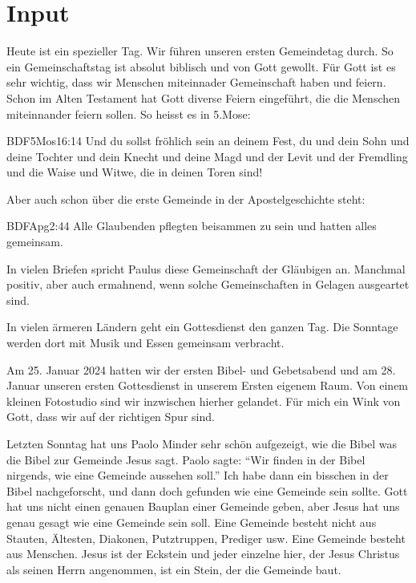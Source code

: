 \documentclass{../../inc/mybib}
\begin{document}
\section{ Input }
\begin{spacing}{1.5}
    Heute ist ein spezieller Tag. Wir führen unseren ersten Gemeindetag durch. So ein Gemeinschaftstag ist absolut biblisch und von Gott gewollt. Für Gott ist es sehr wichtig, dass wir Menschen miteinnader Gemeinschaft haben und feiern. Schon im Alten Testament hat Gott diverse Feiern eingeführt, die die Menschen miteinnander feiern sollen. So heisst es in 5.Mose:
\begin{bibelbox}{BDF}{5Mos}{16:14}
    Und du sollst fröhlich sein an deinem Fest, du und dein Sohn und deine Tochter und dein Knecht und deine Magd und der Levit und der Fremdling und die Waise und Witwe, die in deinen Toren sind!
\end{bibelbox}
Aber auch schon über die erste Gemeinde in der Apostelgeschichte steht:
\begin{bibelbox}{BDF}{Apg}{2:44}
    Alle Glaubenden pflegten beisammen zu sein und hatten alles gemeinsam.
\end{bibelbox}
In vielen Briefen spricht Paulus diese Gemeinschaft der Gläubigen an. Manchmal positiv, aber auch ermahnend, wenn solche Gemeinschaften in Gelagen ausgeartet sind.

In vielen ärmeren Ländern geht ein Gottesdienst den ganzen Tag. Die Sonntage werden dort mit Musik und Essen gemeinsam verbracht.

Am 25. Januar 2024 hatten wir der ersten Bibel- und Gebetsabend und am 28. Januar unseren ersten Gottesdienst in unserem Ersten eigenem Raum. Von einem kleinen Fotostudio sind wir inzwischen hierher gelandet. Für mich ein Wink von Gott, dass wir auf der richtigen Spur sind.

Letzten Sonntag hat uns Paolo Minder sehr schön aufgezeigt, wie die Bibel was die Bibel zur Gemeinde Jesus sagt. Paolo sagte: \enquote{Wir finden in der Bibel nirgends, wie eine Gemeinde aussehen soll.} Ich habe dann ein bisschen in der Bibel nachgeforscht, und dann doch gefunden wie eine Gemeinde sein sollte. Gott hat uns nicht einen genauen Bauplan einer Gemeinde geben, aber Jesus hat uns genau gesagt wie eine Gemeinde sein soll. Eine Gemeinde besteht nicht aus Stauten, Ältesten, Diakonen, Putztruppen, Prediger usw. Eine Gemeinde besteht aus Menschen. Jesus ist der Eckstein und jeder einzelne hier, der Jesus Christus als seinen Herrn angenommen, ist ein Stein, der die Gemeinde baut. 


\end{spacing}
\end{document}
